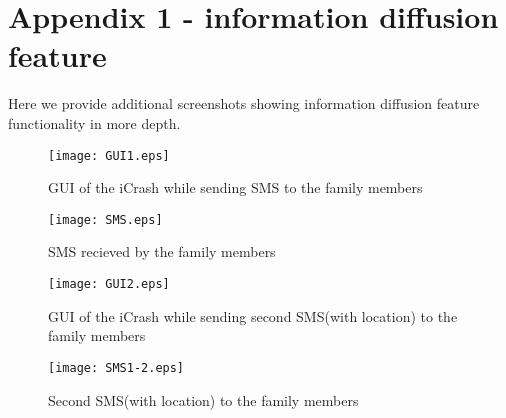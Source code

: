 \chapter{Appendix 1 - information diffusion feature}
\label{chap:appendix1}

Here we provide additional screenshots showing information diffusion feature
functionality in more depth.

\begin{figure}[h]
    \texttt{[image: GUI1.eps]}
	\caption{GUI of the iCrash while sending SMS to the family members}
\end{figure}

\begin{figure}[h]
    \texttt{[image: SMS.eps]}
	\caption{SMS recieved by the family members}
\end{figure}

\begin{figure}[h]
    \texttt{[image: GUI2.eps]}
	\caption{GUI of the iCrash while sending second SMS(with location) to the
	family members}
\end{figure}

\begin{figure}[h]
    \texttt{[image: SMS1-2.eps]}
	\caption{Second SMS(with location) to the family members}
\end{figure}





